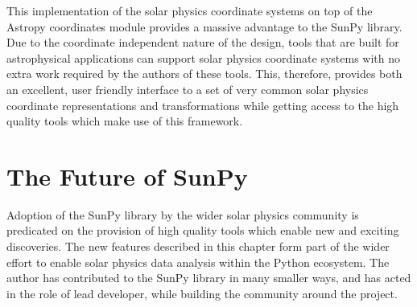 This implementation of the solar physics coordinate systems on top of the Astropy coordinates module provides a massive advantage to the SunPy library.
Due to the coordinate independent nature of the design, tools that are built for astrophysical applications can support solar physics coordinate systems with no extra work required by the authors of these tools.
This, therefore, provides both an excellent, user friendly interface to a set of very common solar physics coordinate representations and transformations while getting access to the high quality tools which make use of this framework.

\section{The Future of SunPy}

Adoption of the SunPy library by the wider solar physics community is predicated on the provision of high quality tools which enable new and exciting discoveries.
The new features described in this chapter form part of the wider effort to enable solar physics data analysis within the Python ecosystem.
The author has contributed to the SunPy library in many smaller ways, and has acted in the role of lead developer, while building the community around the project.

